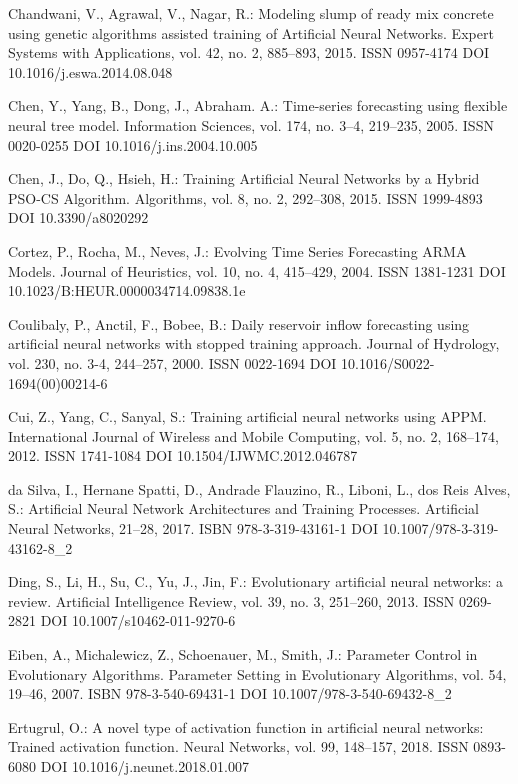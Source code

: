 \begin{thebibliography}{99.}
 Chandwani, V., Agrawal, V., Nagar, R.: Modeling slump of ready mix concrete using genetic algorithms assisted training of Artificial Neural Networks. Expert Systems with Applications, vol. 42, no. 2, 885--893, 2015. ISSN 0957-4174 DOI 10.1016/j.eswa.2014.08.048

 Chen, Y., Yang, B., Dong, J., Abraham. A.: Time-series forecasting using flexible neural tree model. Information Sciences, vol. 174, no. 3--4, 219--235, 2005. ISSN 0020-0255 DOI 10.1016/j.ins.2004.10.005

 Chen, J., Do, Q., Hsieh, H.: Training Artificial Neural Networks by a Hybrid PSO-CS Algorithm. Algorithms, vol. 8, no. 2, 292--308, 2015. ISSN 1999-4893 DOI 10.3390/a8020292

 Cortez, P., Rocha, M., Neves, J.: Evolving Time Series Forecasting ARMA Models. Journal of Heuristics, vol. 10, no. 4, 415--429, 2004. ISSN 1381-1231 DOI 10.1023/B:HEUR.0000034714.09838.1e

 Coulibaly, P., Anctil, F., Bobee, B.: Daily reservoir inflow forecasting using artificial neural networks with stopped training approach. Journal of Hydrology, vol. 230, no. 3-4, 244--257, 2000. ISSN 0022-1694 DOI 10.1016/S0022-1694(00)00214-6

 Cui, Z., Yang, C., Sanyal, S.: Training artificial neural networks using APPM. International Journal of Wireless and Mobile Computing, vol. 5, no. 2, 168--174, 2012. ISSN 1741-1084 DOI 10.1504/IJWMC.2012.046787

 da Silva, I., Hernane Spatti, D., Andrade Flauzino, R., Liboni, L., dos Reis Alves, S.: Artificial Neural Network Architectures and Training Processes. Artificial Neural Networks, 21--28, 2017. ISBN 978-3-319-43161-1 DOI 10.1007/978-3-319-43162-8\_2

 Ding, S., Li, H., Su, C., Yu, J., Jin, F.: Evolutionary artificial neural networks: a review. Artificial Intelligence Review, vol. 39, no. 3, 251--260, 2013. ISSN 0269-2821 DOI 10.1007/s10462-011-9270-6

 Eiben, A., Michalewicz, Z., Schoenauer, M., Smith, J.: Parameter Control in Evolutionary Algorithms. Parameter Setting in Evolutionary Algorithms, vol. 54, 19--46, 2007. ISBN 978-3-540-69431-1 DOI 10.1007/978-3-540-69432-8\_2

 Ertugrul, O.: A novel type of activation function in artificial neural networks: Trained activation function. Neural Networks, vol. 99, 148--157, 2018. ISSN 0893-6080 DOI 10.1016/j.neunet.2018.01.007


\end{thebibliography}
